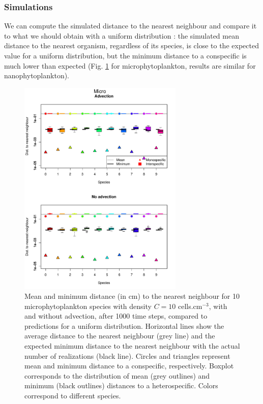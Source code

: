 \documentclass[english]{article}
\begin{document}
\subsubsection*{Simulations}

We can compute the simulated distance to the nearest neighbour and
compare it to what we should obtain with a uniform distribution :
the simulated mean distance to the nearest organism, regardless of
its species, is close to the expected value for a uniform distribution,
but the minimum distance to a conspecific is much lower than expected
(Fig. \ref{fig:Distance_micro} for microphytoplankton, results are
similar for nanophytoplankton).

\begin{figure}[H]
\begin{centering}
\includegraphics[width=0.7\textwidth]{../code/figure/distrib_distance_micro_box_10sp}
\par\end{centering}
\caption{Mean and minimum distance (in cm) to the nearest neighbour for 10
microphytoplankton species with density $C=10$ cells.cm$^{-3}$,
with and without advection, after 1000 time steps, compared to predictions
for a uniform distribution. Horizontal lines show the average distance
to the nearest neighbour (grey line) and the expected minimum distance
to the nearest neighbour with the actual number of realizations (black
line). Circles and triangles represent mean and minimum distance to
a conspecific, respectively. Boxplot corresponds to the distribution
of mean (grey outlines) and minimum (black outlines) distances to
a heterospecific. Colors correspond to different species. \label{fig:Distance_micro}}
\end{figure}
\end{document}
